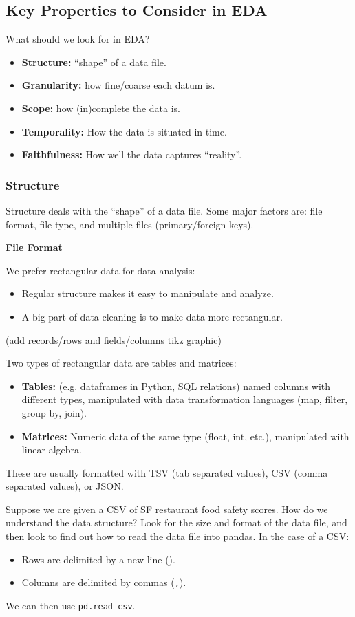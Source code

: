 \subsection{Key Properties to Consider in EDA}
What should we look for in EDA? 
\begin{itemize}
\item \textbf{Structure:} ``shape'' of a data file.
\item \textbf{Granularity:} how fine/coarse each datum is.
\item \textbf{Scope:} how (in)complete the data is.
\item \textbf{Temporality:} How the data is situated in time.
\item \textbf{Faithfulness:} How well the data captures ``reality''.
\end{itemize}

\subsubsection{Structure}
Structure deals with the ``shape'' of a data file. Some major factors are: file format, file type, and multiple files (primary/foreign keys).

\textbf{File Format}

We prefer rectangular data for data analysis:
\begin{itemize}
\item Regular structure makes it easy to manipulate and analyze.
\item A big part of data cleaning is to make data more rectangular.
\end{itemize}
(add records/rows and fields/columns tikz graphic)

Two types of rectangular data are tables and matrices:
\begin{itemize}
\item \textbf{Tables:} (e.g. dataframes in Python, SQL relations) named columns with different types, manipulated with data transformation languages (map, filter, group by, join).
\item \textbf{Matrices:} Numeric data of the same type (float, int, etc.), manipulated with linear algebra.
\end{itemize}
These are usually formatted with TSV (tab separated values), CSV (comma separated values), or JSON.

\begin{example}[]{Suppose we are given a CSV of SF restaurant food safety scores. How do we understand the data structure?
\tcbline
Look for the size and format of the data file, and then look to find out how to read the data file into pandas. In the case of a CSV:
\begin{itemize}
\item Rows are delimited by a new line (\texttt{\n}).
\item Columns are delimited by commas (\texttt{,}).
\end{itemize}
We can then use \texttt{pd.read_csv}.
}
\end{example}

